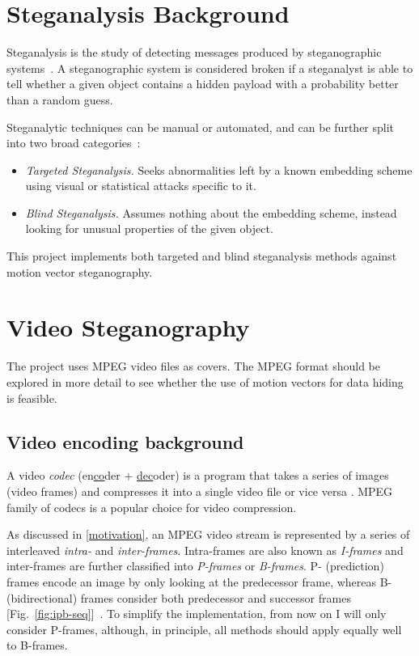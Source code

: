 \documentclass[12pt,british,twoside,notitlepage,usenames,dvipsnames,hypens,final]{report}
\numberwithin{equation}{section}
\numberwithin{figure}{section}
\begin{document}
\section{Steganalysis Background}

Steganalysis is the study of detecting messages produced by steganographic systems~\cite[p.~10]{fridrich}. A steganographic system is considered broken if a steganalyst is able to tell whether a given object contains a hidden payload with a probability better than a random guess.

Steganalytic techniques can be manual or automated, and can be further split into two broad categories~\cite{bateman}:
\begin{itemize}
\item \emph{Targeted Steganalysis.} Seeks abnormalities left by a known embedding scheme using visual or statistical attacks specific to it.
\item \emph{Blind Steganalysis.} Assumes nothing about the embedding scheme, instead looking for unusual properties of the given object. 
\end{itemize} 

This project implements both targeted and blind steganalysis methods against motion vector steganography.

\section{Video Steganography}

The project uses MPEG video files as covers. The MPEG format should be explored in more detail to see whether the use of motion vectors for data hiding is feasible.

\subsection{Video encoding background}

A video \emph{codec} (en\underline{co}der + \underline{dec}oder) is a program that takes a series of images (video frames) and compresses it into a single video file or vice versa \cite[sec.~3.1]{richardson2004h}. MPEG family of codecs is a popular choice for video compression.

As discussed in \ref{motivation}, an MPEG video stream is represented by a series of interleaved \emph{intra-} and \emph{inter-frames}. Intra-frames are also known as \emph{I-frames} and inter-frames are further classified into \emph{P-frames} or \emph{B-frames}. P- (prediction) frames encode an image by only looking at the predecessor frame, whereas B- (bidirectional) frames consider both predecessor and successor frames [Fig.~\ref{fig:ipb-seq}]~\cite{crowcroft1999internetworking}. To simplify the implementation, from now on I will only consider P-frames, although, in principle, all methods should apply equally well to B-frames.
\end{document}
